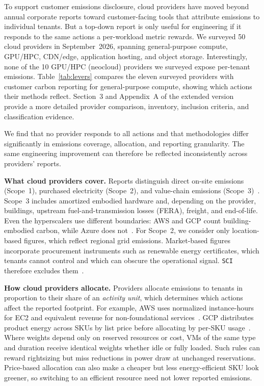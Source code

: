 \documentclass[sigconf]{acmart}
\newcommand{\parag}[1]{\vspace{2mm}\noindent\textbf{#1.}\hspace{2mm}}
\newcommand{\SCI}{\texttt{SCI}\xspace}
\begin{document}
To support customer emissions disclosure, cloud providers have moved beyond annual corporate reports toward customer-facing tools that attribute emissions to individual tenants.
But a top-down report is only useful for engineering if it responds to the same actions a per-workload metric rewards.
We surveyed 50 cloud providers in September~2026, spanning general-purpose compute, GPU/HPC, CDN/edge, application hosting, and object storage.
Interestingly, none of the 10 GPU/HPC (neocloud) providers we surveyed expose per-tenant emissions.
Table~\ref{tab:levers} compares the eleven surveyed providers with customer carbon reporting for general-purpose compute, showing which actions their methods reflect.
Section~3 and Appendix~A of the extended version~\cite{rsci-extended} provide a more detailed provider comparison, inventory, inclusion criteria, and classification evidence.

We find that no provider responds to all actions and that methodologies differ significantly in emissions coverage, allocation, and reporting granularity.
The same engineering improvement can therefore be reflected inconsistently across providers' reports.

\parag{What cloud providers cover}
Reports distinguish direct on-site emissions (Scope~1), purchased electricity (Scope~2), and value-chain emissions (Scope~3)~\cite{ghg-protocol-corp}.
Scope~3 includes amortized embodied hardware and, depending on the provider, buildings, upstream fuel-and-transmission losses (FERA), freight, and end-of-life.
Even the hyperscalers use different boundaries: AWS and GCP count building-embodied carbon, while Azure does not~\cite{aws-ccft-model3,google-carbon-methodology,microsoft-s3-2021}.
For Scope~2, we consider only location-based figures, which reflect regional grid emissions.
Market-based figures incorporate procurement instruments such as renewable energy certificates, which tenants cannot control and which can obscure the operational signal. \SCI therefore excludes them~\cite{sci-spec}.

\parag{How cloud providers allocate}
Providers allocate emissions to tenants in proportion to their share of an \emph{activity unit}, which determines which actions affect the reported footprint.
For example,  AWS uses normalized instance-hours for EC2 and equivalent revenue for non-foundational services~\cite{aws-ccft-model3}.
GCP distributes product energy across SKUs by list price before allocating by per-SKU usage~\cite{schneider-mattia-2024}.
Where weights depend only on reserved resources or cost, VMs of the same type and duration receive identical weights whether idle or fully loaded.
Such rules can reward rightsizing but miss reductions in power draw at unchanged reservations.
Price-based allocation can also make a cheaper but less energy-efficient SKU look greener, so switching to an efficient resource need not lower reported emissions.
\end{document}

